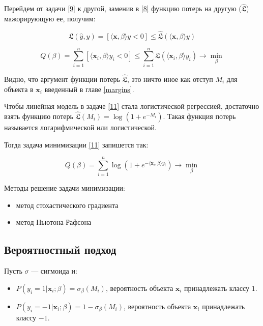 \documentclass[11pt, oneside]{article}   	%
\begin{document}
Перейдем от задачи \ref{9} к другой, заменив в \ref{8} функцию потерь на другую  ($ \hat{\mathfrak{L}} $) мажорирующую ее, получим:

\begin{equation}
	\mathfrak{L}(\hat{y}, y) = [ \langle \bm{x}, \beta \rangle y < 0 ] \leqslant \hat{\mathfrak{L}}( \langle \bm{x}, \beta \rangle y)
	\label{10}
\end{equation}

\begin{equation}
Q(\beta) = \sum\limits_{i = 1}^{n} [\langle \bm{x}_i, \beta \rangle y_i < 0] \leqslant \sum\limits_{i = 1}^{n} \hat{\mathfrak{L}}( \langle \bm{x}_i, \beta \rangle y_i)  \rightarrow \min\limits_{\beta}
\label{11}
\end{equation}

Видно, что аргумент функции потерь $\hat{\mathfrak{L}}$, это ничто иное как отступ $M_i$ для объекта в $\bm{x}_i$ введенный в главе \ref{margins}.

Чтобы линейная модель в задаче \ref{11} стала логистической регрессией, достаточно взять функцию потерь $\hat{\mathfrak{L}}(M_i) = \log(1 + e^{-M_i})$. Такая функция потерь называется логарифмической или логистической. 

Тогда задача минимизации \ref{11} запишется так:

\begin{equation}
	Q(\beta) = \sum\limits_{i = 1}^{n} \log(1 + e^{- \langle \bm{x}_i, \beta \rangle y_i})  \rightarrow \min\limits_{\beta}
	\label{12}
\end{equation}

Методы решение задачи минимизации:

\begin{itemize}
	\item метод стохастического градиента
	\item метод Ньютона-Рафсона
\end{itemize}

\subsection{Вероятностный подход}

Пусть $\sigma$ --- сигмоида и:

\begin{itemize}
	\item $P(y_i = 1 | \bm{x}_i; \beta) = \sigma_\beta(M_i) $, вероятность объекта $\bm{x}_i$ принадлежать классу $1$.
	\item $P(y_i = -1 | \bm{x}_i; \beta) = 1 - \sigma_\beta(M_i) $, вероятность объекта $\bm{x}_i$ принадлежать классу $-1$.
\end{itemize}
\end{document}
